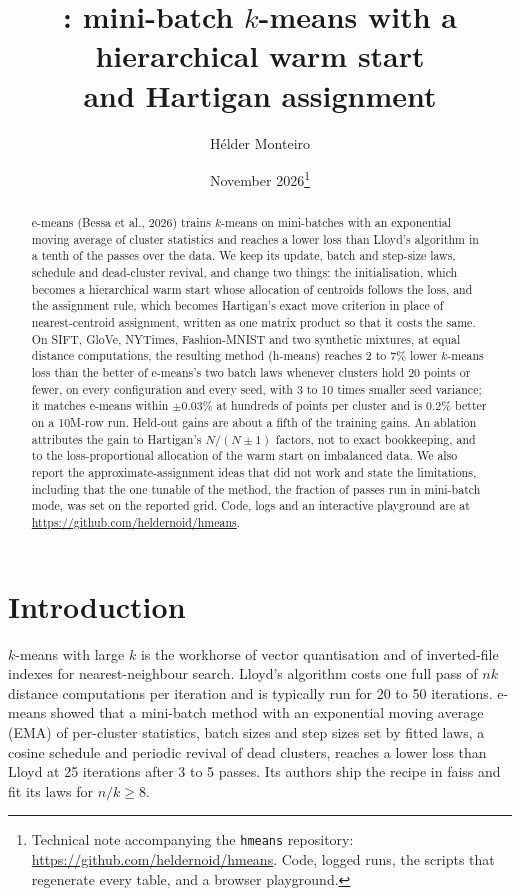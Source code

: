 \documentclass[11pt]{article}
\title{\hm: mini-batch $k$-means with a hierarchical warm start\\and Hartigan assignment}
\author{Hélder Monteiro}
\date{November 2026\thanks{Technical note accompanying the \texttt{hmeans} repository: \url{https://github.com/heldernoid/hmeans}. Code, logged runs, the scripts that regenerate every table, and a browser playground.}}
\newcommand{\hm}{h-means}
\newcommand{\emeans}{e-means}
\newcommand{\nk}{n/k}
\begin{document}
\maketitle

\begin{abstract}
\emeans{} (Bessa et al., 2026) trains $k$-means on mini-batches with an exponential moving average of cluster statistics and reaches a lower loss than Lloyd's algorithm in a tenth of the passes over the data. We keep its update, batch and step-size laws, schedule and dead-cluster revival, and change two things: the initialisation, which becomes a hierarchical warm start whose allocation of centroids follows the loss, and the assignment rule, which becomes Hartigan's exact move criterion in place of nearest-centroid assignment, written as one matrix product so that it costs the same. On SIFT, GloVe, NYTimes, Fashion-MNIST and two synthetic mixtures, at equal distance computations, the resulting method (\hm) reaches 2 to 7\% lower $k$-means loss than the better of \emeans's two batch laws whenever clusters hold 20 points or fewer, on every configuration and every seed, with 3 to 10 times smaller seed variance; it matches \emeans{} within $\pm0.03\%$ at hundreds of points per cluster and is 0.2\% better on a 10M-row run. Held-out gains are about a fifth of the training gains. An ablation attributes the gain to Hartigan's $N/(N\pm1)$ factors, not to exact bookkeeping, and to the loss-proportional allocation of the warm start on imbalanced data. We also report the approximate-assignment ideas that did not work and state the limitations, including that the one tunable of the method, the fraction of passes run in mini-batch mode, was set on the reported grid. Code, logs and an interactive playground are at \url{https://github.com/heldernoid/hmeans}.
\end{abstract}

\section{Introduction}

$k$-means with large $k$ is the workhorse of vector quantisation and of inverted-file indexes for nearest-neighbour search. Lloyd's algorithm costs one full pass of $n k$ distance computations per iteration and is typically run for 20 to 50 iterations. \emeans{} \cite{emeans} showed that a mini-batch method with an exponential moving average (EMA) of per-cluster statistics, batch sizes and step sizes set by fitted laws, a cosine schedule and periodic revival of dead clusters, reaches a lower loss than Lloyd at 25 iterations after 3 to 5 passes. Its authors ship the recipe in faiss and fit its laws for $\nk \ge 8$.
\end{document}
